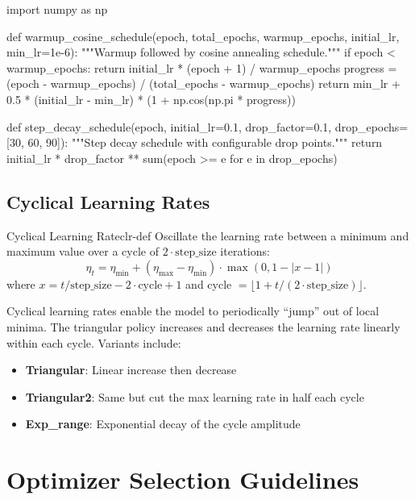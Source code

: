 \documentclass[../../main.tex]{subfiles}
\begin{document}
\begin{pythoncode}
import numpy as np

def warmup_cosine_schedule(epoch, total_epochs, warmup_epochs, initial_lr, min_lr=1e-6):
    """Warmup followed by cosine annealing schedule."""
    if epoch < warmup_epochs:
        return initial_lr * (epoch + 1) / warmup_epochs
    progress = (epoch - warmup_epochs) / (total_epochs - warmup_epochs)
    return min_lr + 0.5 * (initial_lr - min_lr) * (1 + np.cos(np.pi * progress))

def step_decay_schedule(epoch, initial_lr=0.1, drop_factor=0.1, drop_epochs=[30, 60, 90]):
    """Step decay schedule with configurable drop points."""
    return initial_lr * drop_factor ** sum(epoch >= e for e in drop_epochs)
\end{pythoncode}

\subsection{Cyclical Learning Rates}

\begin{definition}{Cyclical Learning Rate}{clr-def}
Oscillate the learning rate between a minimum and maximum value over a cycle of $2 \cdot \text{step\_size}$ iterations:
\[
    \eta_t = \eta_{\min} + (\eta_{\max} - \eta_{\min}) \cdot \max(0, 1 - |x - 1|)
\]
where $x = t/\text{step\_size} - 2 \cdot \text{cycle} + 1$ and cycle $= \lfloor 1 + t/(2 \cdot \text{step\_size}) \rfloor$.
\end{definition}

Cyclical learning rates enable the model to periodically ``jump'' out of local minima. The triangular policy increases and decreases the learning rate linearly within each cycle. Variants include:
\begin{itemize}
    \item \textbf{Triangular}: Linear increase then decrease
    \item \textbf{Triangular2}: Same but cut the max learning rate in half each cycle
    \item \textbf{Exp\_range}: Exponential decay of the cycle amplitude
\end{itemize}

\section{Optimizer Selection Guidelines}
\label{sec:optimizer-selection}
\end{document}
